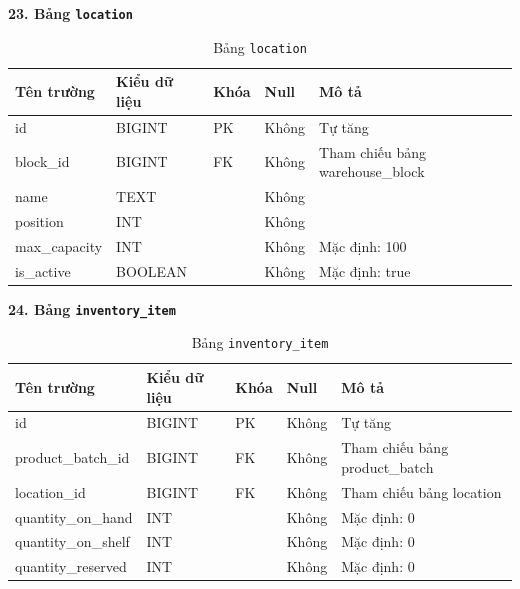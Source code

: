 \documentclass[12pt,a4paper]{report}
\begin{document}
\vspace{0.3cm}
\textbf{23. Bảng \texttt{location}}
\vspace{0.1cm}
\begin{longtable}{|>{\ttfamily}p{3.5cm}|p{2.5cm}|p{1.5cm}|p{1.5cm}|p{5cm}|}
\caption{Bảng \texttt{location}} \label{tab:db_location} \\
\hline
\normalfont\textbf{Tên trường} & \textbf{Kiểu dữ liệu} & \textbf{Khóa} & \textbf{Null} & \textbf{Mô tả} \\ \hline
id & BIGINT & PK & Không & Tự tăng \\ \hline
block\_id & BIGINT & FK & Không & Tham chiếu bảng warehouse\_block \\ \hline
name & TEXT & & Không & \\ \hline
position & INT & & Không & \\ \hline
max\_capacity & INT & & Không & Mặc định: 100 \\ \hline
is\_active & BOOLEAN & & Không & Mặc định: true \\ \hline
\end{longtable}

\vspace{0.3cm}
\textbf{24. Bảng \texttt{inventory\_item}}
\vspace{0.1cm}
\begin{longtable}{|>{\ttfamily}p{3.5cm}|p{2.5cm}|p{1.5cm}|p{1.5cm}|p{5cm}|}
\caption{Bảng \texttt{inventory\_item}} \label{tab:db_inventory_item} \\
\hline
\normalfont\textbf{Tên trường} & \textbf{Kiểu dữ liệu} & \textbf{Khóa} & \textbf{Null} & \textbf{Mô tả} \\ \hline
id & BIGINT & PK & Không & Tự tăng \\ \hline
product\_batch\_id & BIGINT & FK & Không & Tham chiếu bảng product\_batch \\ \hline
location\_id & BIGINT & FK & Không & Tham chiếu bảng location \\ \hline
quantity\_on\_hand & INT & & Không & Mặc định: 0 \\ \hline
quantity\_on\_shelf & INT & & Không & Mặc định: 0 \\ \hline
quantity\_reserved & INT & & Không & Mặc định: 0 \\ \hline
\end{longtable}
\end{document}
